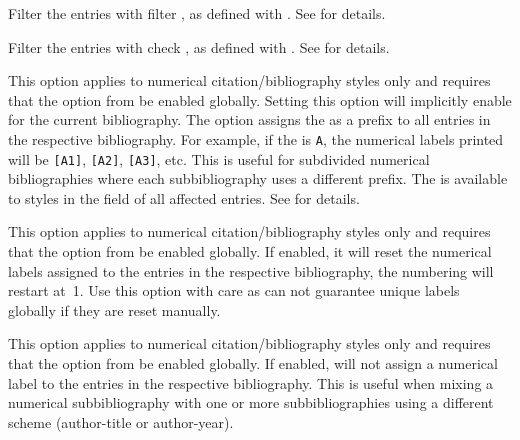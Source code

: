 \documentclass{ltxdockit}[2011/03/25]
\begin{document}
\begin{optionlist*}

Filter the entries with filter , as defined with . See  for details.


Filter the entries with check , as defined with . See  for details.


This option applies to numerical citation\slash bibliography styles only and requires that the  option from  be enabled globally. Setting this option will implicitly enable  for the current bibliography. The option assigns the  as a prefix to all entries in the respective bibliography. For example, if the  is \texttt{A}, the numerical labels printed will be \texttt{[A1]}, \texttt{[A2]}, \texttt{[A3]}, etc. This is useful for subdivided numerical bibliographies where each subbibliography uses a different prefix. The  is available to styles in the  field of all affected entries. See  for details.


This option applies to numerical citation\slash bibliography styles only and requires that the  option from  be enabled globally. If enabled, it will reset the numerical labels assigned to the entries in the respective bibliography, \ie the numbering will restart at~1. Use this option with care as  can not guarantee unique labels globally if they are reset manually.


This option applies to numerical citation\slash bibliography styles only and requires that the  option from  be enabled globally. If enabled,  will not assign a numerical label to the entries in the respective bibliography. This is useful when mixing a numerical subbibliography with one or more subbibliographies using a different scheme (\eg author-title or author-year).

\end{optionlist*}
\end{document}
